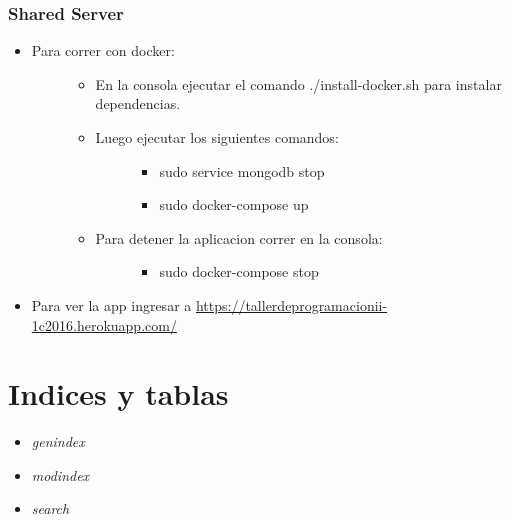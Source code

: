 \documentclass[letterpaper,10pt,english]{sphinxmanual}
\begin{document}
\subsection{Shared Server}
\label{manuals:id10}\begin{itemize}
\item {} \begin{description}
\item[{Para correr con docker:}] \leavevmode\begin{itemize}
\item {} 
En la consola ejecutar el comando ./install-docker.sh para instalar dependencias.

\item {} \begin{description}
\item[{Luego ejecutar los siguientes comandos:}] \leavevmode\begin{itemize}
\item {} 
sudo service mongodb stop

\item {} 
sudo docker-compose up

\end{itemize}

\end{description}

\item {} \begin{description}
\item[{Para detener la aplicacion correr en la consola:}] \leavevmode\begin{itemize}
\item {} 
sudo docker-compose stop

\end{itemize}

\end{description}

\end{itemize}

\end{description}

\item {} 
Para ver la app ingresar a \href{https://tallerdeprogramacionii-1c2016.herokuapp.com/}{https://tallerdeprogramacionii-1c2016.herokuapp.com/}

\end{itemize}


\chapter{Indices y tablas}
\label{index:indices-y-tablas}\begin{itemize}
\item {} 
\emph{genindex}

\item {} 
\emph{modindex}

\item {} 
\emph{search}

\end{itemize}



\renewcommand{\indexname}{Index}
\printindex
\end{document}

